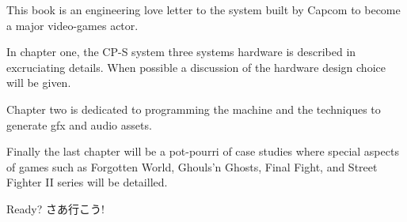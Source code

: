 This book is an engineering love letter to the system built by Capcom to become a major video-games actor. 

In chapter one, the CP-S system three systems hardware is described in excruciating details. When possible a discussion of the hardware design choice will be given.

Chapter two is dedicated to programming the machine and the techniques to generate gfx and audio assets.

Finally the last chapter will be a pot-pourri of case studies where special aspects of games such as Forgotten World, Ghouls'n Ghosts, Final Fight, and Street Fighter II series will be detailled.

\begin{CJK}{UTF8}{min}
Ready? さあ行こう!
\end{CJK}


